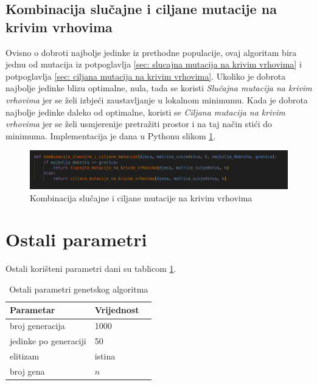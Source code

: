 \documentclass[times, utf8, zavrsni]{fer}
\begin{document}
\subsection{Kombinacija slučajne i ciljane mutacije na krivim vrhovima}
\label{sec: kombinacija slucajne i ciljane mutacije na krivim vrhovima}
Ovisno o dobroti najbolje jedinke iz prethodne populacije, ovaj algoritam bira jednu od mutacija iz potpoglavlja \ref{sec: slucajna mutacija na krivim vrhovima} i potpoglavlja \ref{sec: ciljana mutacija na krivim vrhovima}. Ukoliko je dobrota najbolje jedinke blizu optimalne, nula, tada se koristi \textit{Slučajna mutacija na krivim vrhovima} jer se želi izbjeći zaustavljanje u lokalnom minimumu. Kada je dobrota najbolje jedinke daleko od optimalne, koristi se \textit{Ciljana mutacija na krivim vrhovima} jer se želi usmjerenije pretražiti prostor i na taj način stići do minimuma. Implementacija je dana u Pythonu slikom \ref{fig:kombinacija slucajen i ciljane mutacije}.

\begin{figure}[htb]
\centering
\includegraphics[width=14cm]{images/kombinacija_slucajne_i_ciljane_mutacije.png}
\caption{Kombinacija slučajne i ciljane mutacije na krivim vrhovima}
\label{fig:kombinacija slucajen i ciljane mutacije}
\end{figure}

\section{Ostali parametri}
Ostali korišteni parametri dani su tablicom \ref{tbl:ostali parametri genetrskog algoritma}.

\begin{table}[htb]
\caption{Ostali parametri genetskog algoritma}
\label{tbl:ostali parametri genetrskog algoritma}
\centering
\begin{tabular}{llr} \hline
Parametar & Vrijednost\\ \hline
broj generacija & 1000 \\
jedinke po generaciji & 50 \\
elitizam & istina \\
broj gena & $n$ \\ \hline
\end{tabular}
\end{table}
\end{document}

